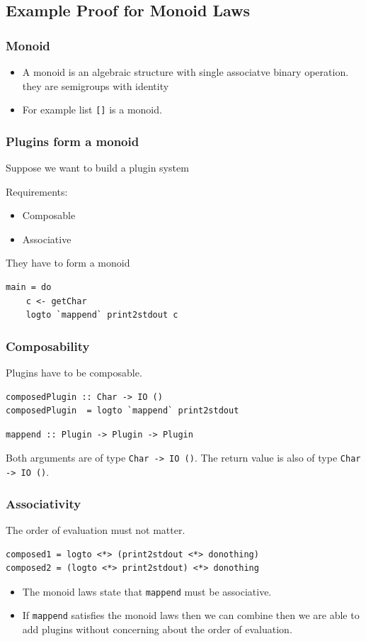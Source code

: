 \documentclass{beamer}
\begin{document}
\subsection{Example Proof for Monoid  Laws}

\begin{frame}[fragile]
  \frametitle{Monoid}
  \begin{itemize}
\item A monoid is an algebraic structure with single associatve binary operation. they are semigroups with identity
  \item For example list \verb|[]| is a monoid.
  \end{itemize}

\end{frame}

\begin{frame}[fragile]
\frametitle{Plugins form a monoid}
  Suppose we want to build a plugin system

Requirements:
\begin{itemize}
\item Composable
\item Associative
\end{itemize}

They have to form a monoid

\begin{verbatim}
main = do
    c <- getChar
    logto `mappend` print2stdout c
\end{verbatim}
\end{frame}



\begin{frame}[fragile]
\frametitle{Composability}
Plugins have to be composable.
\begin{verbatim}
composedPlugin :: Char -> IO ()
composedPlugin  = logto `mappend` print2stdout
\end{verbatim}
\begin{verbatim}
mappend :: Plugin -> Plugin -> Plugin
\end{verbatim}
Both arguments are of type \verb|Char -> IO ()|. The return value is also of type \verb|Char -> IO ()|.
\end{frame}

\begin{frame}[fragile]
\frametitle{Associativity}
The order of evaluation must not matter.
\begin{verbatim}
composed1 = logto <*> (print2stdout <*> donothing)
composed2 = (logto <*> print2stdout) <*> donothing
\end{verbatim}

\begin{itemize}
\item The monoid laws state that \verb|mappend| must be associative.
\item If \verb|mappend| satisfies the monoid laws then we can combine then we are able to add plugins without concerning about the order of evaluation.
\end{itemize}

\end{frame}
\end{document}
